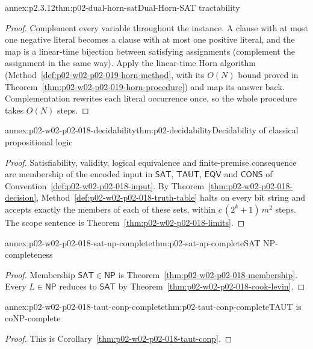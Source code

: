 \begin{annexitem}{annex:p2.3.12}{thm:p02-dual-horn-sat}{Dual-Horn-SAT tractability}
\begin{proof}
Complement every variable throughout the instance.  A clause with at most one
negative literal becomes a clause with at most one positive literal, and the
map is a linear-time bijection between satisfying assignments (complement the
assignment in the same way).  Apply the linear-time Horn algorithm
(Method~\ref{def:p02-w02-p02-019-horn-method}, with its \(O(N)\) bound
proved in Theorem~\ref{thm:p02-w02-p02-019-horn-procedure}) and map its
answer back.  Complementation rewrites each literal occurrence once, so the
whole procedure takes \(O(N)\) steps.
\end{proof}
\end{annexitem}

\begin{annexitem}{annex:p02-w02-p02-018-decidability}{thm:p02-decidability}{Decidability of classical propositional logic}
\begin{proof}
Satisfiability, validity, logical equivalence and finite-premise consequence
are membership of the encoded input in \(\mathsf{SAT}\), \(\mathsf{TAUT}\),
\(\mathsf{EQV}\) and \(\mathsf{CONS}\) of
Convention~\ref{def:p02-w02-p02-018-input}.  By
Theorem~\ref{thm:p02-w02-p02-018-decision},
Method~\ref{def:p02-w02-p02-018-truth-table} halts on every bit string and
accepts exactly the members of each of these sets, within
\(c\,(2^k+1)\,m^2\) steps.  The scope sentence is
Theorem~\ref{thm:p02-w02-p02-018-limits}.
\end{proof}
\end{annexitem}

\begin{annexitem}{annex:p02-w02-p02-018-sat-np-complete}{thm:p02-sat-np-complete}{SAT NP-completeness}
\begin{proof}
Membership \(\mathsf{SAT}\in\mathsf{NP}\) is
Theorem~\ref{thm:p02-w02-p02-018-membership}.  Every \(L\in\mathsf{NP}\)
reduces to \(\mathsf{SAT}\) by
Theorem~\ref{thm:p02-w02-p02-018-cook-levin}.
\end{proof}
\end{annexitem}

\begin{annexitem}{annex:p02-w02-p02-018-taut-conp-complete}{thm:p02-taut-conp-complete}{TAUT is coNP-complete}
\begin{proof}
This is Corollary~\ref{thm:p02-w02-p02-018-taut-conp}.
\end{proof}
\end{annexitem}
